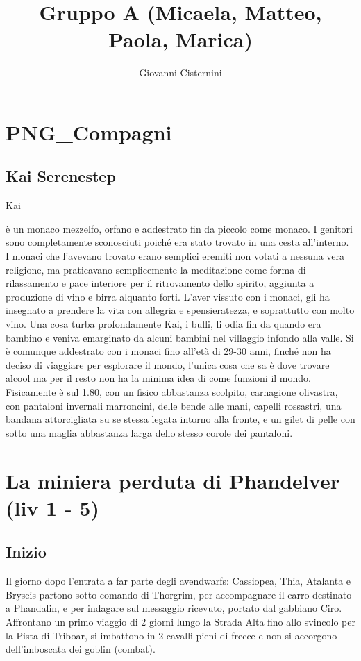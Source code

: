 \documentclass{article}
\title{Gruppo A (Micaela, Matteo, Paola, Marica)}
\author{Giovanni Cisternini}
\begin{document}
\tableofcontents
\newpage
\maketitle


\section{PNG\_Compagni}
\subsection{Kai Serenestep}\hypertarget{kai}{Kai} è un monaco mezzelfo, orfano e addestrato fin da piccolo come monaco. I genitori sono completamente sconosciuti poiché era stato trovato in una cesta all'interno. I monaci che l'avevano trovato erano semplici eremiti non votati a nessuna vera religione, ma praticavano semplicemente la meditazione come forma di rilassamento e pace interiore per il ritrovamento dello spirito, aggiunta a produzione di vino e birra alquanto forti. L'aver vissuto con i monaci, gli ha insegnato a prendere la vita con allegria e spensieratezza, e soprattutto con molto vino. Una cosa turba profondamente Kai, i bulli, li odia fin da quando era bambino e veniva emarginato da alcuni bambini nel villaggio infondo alla valle. Si è comunque addestrato con i monaci fino all'età di 29-30 anni, finché non ha deciso di viaggiare per esplorare il mondo, l'unica cosa che sa è dove trovare alcool ma per il resto non ha la minima idea di come funzioni il mondo. Fisicamente è sul 1.80, con un fisico abbastanza scolpito, carnagione olivastra, con pantaloni invernali marroncini, delle bende alle mani, capelli rossastri, una bandana attorcigliata su se stessa legata intorno alla fronte, e un gilet di pelle con sotto una maglia abbastanza larga dello stesso corole dei pantaloni.  
\section{La miniera perduta di Phandelver (liv 1 - 5)}
\subsection{Inizio}
Il giorno dopo l'entrata a far parte degli avendwarfs: Cassiopea, Thia, Atalanta e Bryseis partono sotto comando di Thorgrim, per accompagnare il carro destinato a Phandalin, e per indagare sul messaggio ricevuto, portato dal gabbiano Ciro. Affrontano un primo viaggio di 2 giorni lungo la Strada Alta fino allo svincolo per la Pista di Triboar, si imbattono in 2 cavalli pieni di frecce e non si accorgono dell'imboscata dei goblin (combat).
\end{document}
